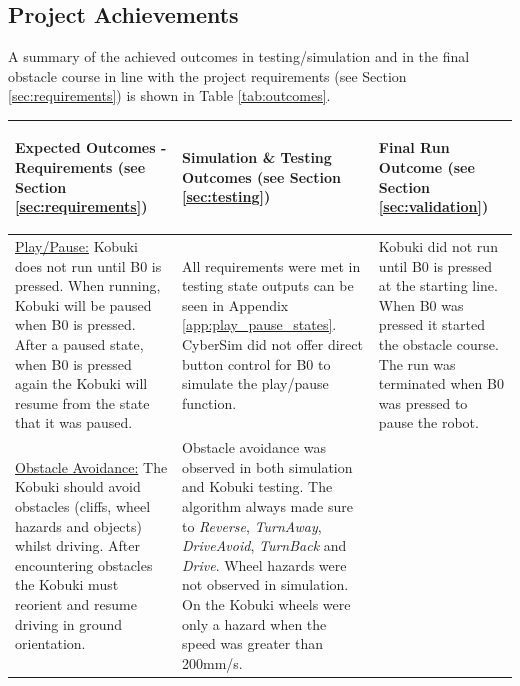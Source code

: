 \subsection{Project Achievements}
\vspace{-0.2cm} A summary of the achieved outcomes in testing/simulation and in the final obstacle course in line with the project requirements (see Section \ref{sec:requirements}) is shown in Table \ref{tab:outcomes}.
\begin{table}[H]
\centering
\begin{tabularx}{\textwidth}{|X|X|X|}
    \hline
    \begin{center}
        \textbf{Expected Outcomes - Requirements} (see Section \ref{sec:requirements})
    \end{center} & 
    \begin{center}
        \textbf{Simulation \& Testing Outcomes} (see Section \ref{sec:testing})
    \end{center} & 
    \begin{center}
        \textbf{Final Run Outcome} \hspace{1cm} (see Section \ref{sec:validation})
    \end{center}\\
    \hline
    \underline{Play/Pause:}
    Kobuki does not run until B0 is pressed.
    When running, Kobuki will be paused when B0 is pressed.
    After a paused state, when B0 is pressed again the Kobuki will resume from the state that it was paused.
    & All requirements were met in testing state outputs can be seen in Appendix \ref{app:play_pause_states}. CyberSim did not offer direct button control for B0 to simulate the play/pause function. 
    & Kobuki did not run until B0 is pressed at the starting line. When B0 was pressed it started the obstacle course. The run was terminated when B0 was pressed to pause the robot.\\
    \hline
    \underline{Obstacle Avoidance:}
    The Kobuki should avoid obstacles (cliffs, wheel hazards and objects) whilst driving.
    After encountering obstacles the Kobuki must reorient and resume driving in ground orientation.
    & Obstacle avoidance was observed in both simulation and Kobuki testing. The algorithm always made sure to \textit{Reverse}, \textit{TurnAway}, \textit{DriveAvoid}, \textit{TurnBack} and \textit{Drive}. Wheel hazards were not observed in simulation. On the Kobuki wheels were only a hazard when the speed was greater than 200mm/s. 

\end{tabularx}
\end{table}
